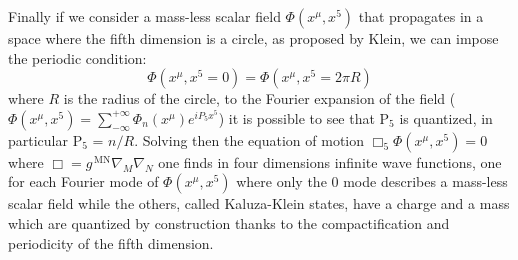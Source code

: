 Finally if we consider a mass-less scalar field $\Phi(x^\mu, x^5)$ that
propagates in a space where the fifth dimension is a circle, as proposed by
Klein, we can impose the periodic condition:
\begin{equation}
  \label{eq:66}
  \Phi(x^\mu, x^5 = 0) = \Phi(x^\mu, x^5 = 2 \pi R)
\end{equation}
where $R$ is the radius of the circle, to the Fourier expansion of the field
($\Phi(x^\mu, x^5) = \sum_{- \infty}^{+ \infty} \Phi_n(x^\mu) e^{i P_5 x^5}$) it
is possible to see that P$_5$ is quantized, in particular P$_5$ = $n /
R$. Solving then the equation of motion $\Box_5 \Phi (x^\mu, x^5) = 0$ where
$\Box = g^{\mathrm{\, MN}} \nabla_M \nabla_N$ one finds in four dimensions
infinite wave functions, one for each Fourier mode of $\Phi (x^\mu, x^5)$ where
only the 0 mode describes a mass-less scalar field while the others, called
Kaluza-Klein states, have a charge and a mass which are quantized by
construction thanks to the compactification and periodicity of the fifth
dimension.
